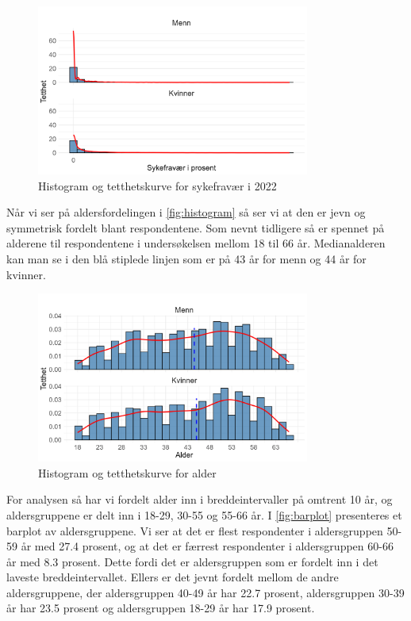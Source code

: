 \documentclass[
  12pt,
  a4paper,
  DIV=11,
  numbers=noendperiod]{scrartcl}
\begin{document}
\begin{figure}[H]
\caption{Histogram og tetthetskurve for sykefravær i 2022}
\label{fig:histogram}
\centering
\includegraphics[width=0.8\textwidth]{dokumentobjekter/figurer/fig_1.png}
\end{figure}

Når vi ser på aldersfordelingen i \autoref{fig:histogram} så ser vi at
den er jevn og symmetrisk fordelt blant respondentene. Som nevnt
tidligere så er spennet på alderene til respondentene i undersøkelsen
mellom 18 til 66 år. Medianalderen kan man se i den blå stiplede linjen
som er på 43 år for menn og 44 år for kvinner.

\begin{figure}[H]
\caption{Histogram og tetthetskurve for alder}
\label{fig:histogram}
\centering
\includegraphics[width=0.8\textwidth]{dokumentobjekter/figurer/fig_2.png}
\end{figure}

For analysen så har vi fordelt alder inn i breddeintervaller på omtrent
10 år, og aldersgruppene er delt inn i 18-29, 30-55 og 55-66 år. I
\autoref{fig:barplot} presenteres et barplot av aldersgruppene. Vi ser
at det er flest respondenter i aldersgruppen 50-59 år med 27.4 prosent,
og at det er færrest respondenter i aldersgruppen 60-66 år med 8.3
prosent. Dette fordi det er aldersgruppen som er fordelt inn i det
laveste breddeintervallet. Ellers er det jevnt fordelt mellom de andre
aldersgruppene, der aldersgruppen 40-49 år har 22.7 prosent,
aldersgruppen 30-39 år har 23.5 prosent og aldersgruppen 18-29 år har
17.9 prosent.
\end{document}
